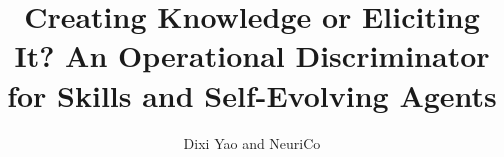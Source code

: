 \documentclass{article}
\title{Creating Knowledge or Eliciting It? An Operational
Discriminator for Skills and Self-Evolving Agents}
\author{Dixi Yao and NeuriCo}
\begin{document}
\maketitle

\begin{abstract}

\end{abstract}









\end{document}
